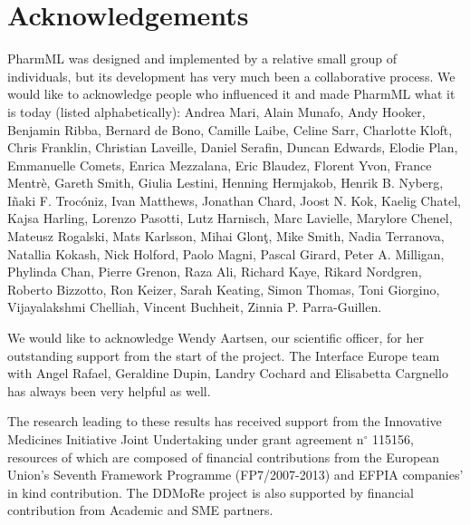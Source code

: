 \chapter*{Acknowledgements}

PharmML was designed and implemented by a relative small group of individuals, 
but its development has very much been a collaborative process.
We would like to acknowledge people who influenced it and made PharmML
what it is today (listed alphabetically): Andrea Mari, Alain Munafo, Andy Hooker, 
Benjamin Ribba, Bernard de Bono, Camille Laibe, Celine Sarr, Charlotte Kloft, Chris Franklin, 
Christian Laveille, Daniel Serafin, Duncan Edwards, Elodie Plan, 
Emmanuelle Comets, Enrica Mezzalana, Eric Blaudez, Florent Yvon, France Mentr\`{e}, 
Gareth Smith, Giulia Lestini, Henning Hermjakob, Henrik B. Nyberg, 
I\~{n}aki F. Troc\'{o}niz, Ivan Matthews, Jonathan Chard, Joost N. Kok, Kaelig Chatel, 
Kajsa Harling, Lorenzo Pasotti, Lutz Harnisch, Marc Lavielle, 
Marylore Chenel, Mateusz Rogalski, Mats Karlsson, Mihai Glon\c{t}, Mike Smith, 
Nadia Terranova, Natallia Kokash, Nick Holford, Paolo Magni, Pascal Girard, Peter A. Milligan, 
Phylinda Chan, Pierre Grenon, Raza Ali, Richard Kaye, Rikard Nordgren, Roberto Bizzotto, 
Ron Keizer, Sarah Keating, Simon Thomas, Toni Giorgino, Vijayalakshmi Chelliah, 
Vincent Buchheit, Zinnia P. Parra-Guillen.

We would like to acknowledge Wendy Aartsen, our scientific officer, for her outstanding support
from the start of the project. The Interface Europe team with  Angel Rafael, Geraldine Dupin, 
Landry Cochard and Elisabetta Cargnello has always been very helpful as well.

The research leading to these results has received support from the Innovative Medicines 
Initiative Joint Undertaking under grant agreement n$^{\circ}$ 115156, resources of which are 
composed of financial contributions from the European Union's Seventh Framework 
Programme (FP7/2007-2013) and EFPIA companies' in kind contribution. The DDMoRe 
project is also supported by financial contribution from Academic and SME partners.